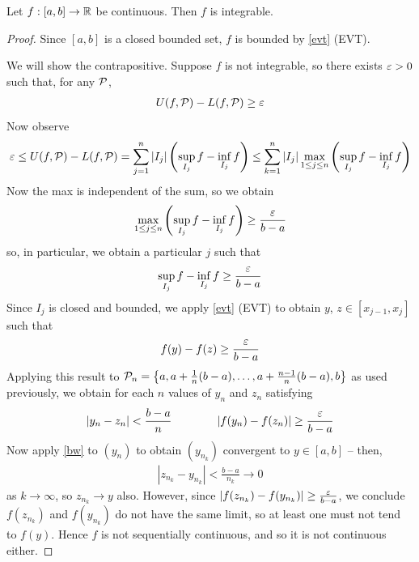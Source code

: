 \documentclass{../template/note}
\begin{document}
    \begin{proposition}
        Let \(f: [a, b] \to \mathbb R\) be continuous. Then \(f\) is integrable.
    \end{proposition}
    
    \begin{proof}
        Since \([a, b]\) is a closed bounded set, \(f\) is bounded by \cref{evt} (EVT).
        
        We will show the contrapositive. Suppose \(f\) is not integrable, so there exists \(\varepsilon > 0\) such that, for any \(\mathcal{P}\),
        \begin{align*}
            U(f, \mathcal{P}) - L(f, \mathcal{P}) \geq \varepsilon
        \end{align*}
        Now observe
        \begin{align*}
            \varepsilon \leq U(f, \mathcal{P}) - L(f, \mathcal{P}) = \sum_{j=1}^n |I_j| \left(\sup_{I_j} f - \inf_{I_j} f\right) \leq \sum_{k=1}^n |I_j| \max_{1 \leq j \leq n} \left(\sup_{I_j} f - \inf_{I_j} f\right)
        \end{align*}
        Now the max is independent of the sum, so we obtain
        \begin{align*}
            \max_{1 \leq j \leq n} \left(\sup_{I_j} f - \inf_{I_j} f\right) \geq \frac{\varepsilon}{b-a}
        \end{align*}
        so, in particular, we obtain a particular \(j\) such that
        \begin{align*}
            \sup_{I_j} f - \inf_{I_j} f \geq \frac{\varepsilon}{b-a}
        \end{align*}
        Since \(I_j\) is closed and bounded, we apply \cref{evt} (EVT) to obtain \(y\), \(z \in [x_{j-1}, x_j]\) such that
        \begin{align*}
            f(y) - f(z) \geq \frac{\varepsilon}{b-a}
        \end{align*}
        Applying this result to \(\mathcal{P}_n = \left\{a, a + \frac 1 n (b-a), \dots, a + \frac{n-1}{n}(b-a), b\right\}\) as used previously, we obtain for each \(n\) values of \(y_n\) and \(z_n\) satisfying
        \begin{align*}
            |y_n - z_n| < \frac{b-a}{n} \qquad\qquad |f(y_n)-f(z_n)| \geq \frac{\varepsilon}{b-a}
        \end{align*}
        Now apply \cref{bw} to \((y_n)\) to obtain \((y_{n_k})\) convergent to \(y \in [a, b]\) -- then,
        \begin{align*}
            |z_{n_k}-y_{n_k}| < \frac{b-a}{n_k} \to 0
        \end{align*}
        as \(k \to \infty\), so \(z_{n_k} \to y\) also. However, since \(|f(z_{n_k})-f(y_{n_k})| \geq \frac{\varepsilon}{b-a}\), we conclude \(f(z_{n_k})\) and \(f(y_{n_k})\) do not have the same limit, so at least one must not tend to \(f(y)\). Hence \(f\) is not sequentially continuous, and so it is not continuous either.       
    \end{proof}
\end{document}
